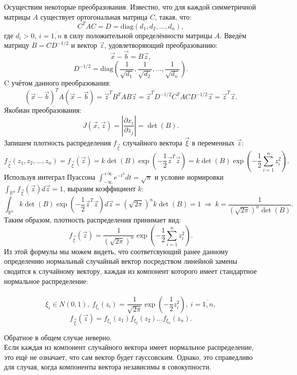 Осуществим некоторые преобразования. Известно, что для каждой симметричной матрицы $A$
существует ортогональная матрица $C$, такая, что: $$ C^T A C = D = \mathrm{diag}(d_1, d_2, \dots, d_n) ,$$
где $d_i > 0 ,~ i = \overline{1, n}$ в силу положительной определённости матрицы $A$. 
Введём матрицу \break $B = C D^{-1/2}$ и вектор $\vec{z}$,
удовлетворяющий преобразованию: $$\vec{x} - \vec{b} = B \vec{z} ,$$
$$ D^{-1/2} = \mathrm{diag}(\frac{1}{\sqrt{d_1}}, \frac{1}{\sqrt{d_2}}, \dots, \frac{1}{\sqrt{d_n}}) .$$
C учётом данного преобразования:
$$ (\vec{x} - \vec{b})^T A (\vec{x} - \vec{b}) =  \vec{z}^T B^T A B \vec{z} = 
\vec{z}^T D^{-1/2} C^T A C D^{-1/2} \vec{z} = \vec{z}^T \vec{z}.$$
Якобиан преобразования:
$$J(\vec{x}, \vec{z}) = \left\lvert \frac{\partial{x_i}}{\partial{z_j}} \right\rvert = \det(B).$$
Запишем плотность распределения $f_{\vec{\xi}}$ случайного вектора $\vec{\xi}$ в переменных $\vec{z}$:
$$ f_{\vec{\xi}}(z_1, z_2, \dots, z_n) = f_{\vec{\xi}}(\vec{z}) =
k \det(B) \exp(-\frac{1}{2} \vec{z}^T \vec{z}) = k \det(B) \exp(-\frac{1}{2} \sum_{i = 1}^{n} z_i^2) .$$
Используя интеграл Пуассона $\displaystyle\int_{-\infty}^{+\infty} e^{-t^2} dt = \sqrt{\pi}$ и условие нормировки
$\displaystyle\int_{\mathbb{R}^n} f_{\vec{\xi}}(\vec{z}) d\vec{z} = 1$, выразим коэффициент $k$:
$$ \int_{\mathbb{R}^n} k \det(B) \exp(-\frac{1}{2} \vec{z}^T \vec{z}) d\vec{z} = 
(\sqrt{2\pi})^n k \det(B) = 1 ~ \Rightarrow ~ k = \frac{1}{(\sqrt{2\pi})^n \det(B)} .$$
Таким образом, плотность распределения принимает вид:
$$ f_{\vec{\xi}}(\vec{z}) = \frac{1}{(\sqrt{2\pi})^n} \exp(-\frac{1}{2} \sum_{i = 1}^{n} z_i^2) .$$
Из этой формулы мы можем видеть, что соответсвующий ранее данному определению нормальный случайный вектор
посредством линейной замены сводится к случайному вектору,
каждая из компонент которого имеет стандартное нормальное распределение: \\\\
$$\xi_i \in N(0, 1) ,~ f_{\xi_i}(z_i) = \frac{1}{\sqrt{2\pi}} \exp(-\frac{1}{2} z_i^2) ,~ i = \overline{1, n} ,$$
$$ f_{\vec{\xi}}(\vec{z}) = f_{\xi_1}(z_1) f_{\xi_2}(z_2) \dots f_{\xi_n}(z_n) .$$ 

\begin{remark} Обратное в общем случае неверно. \\
Если каждая из компонент случайного вектора имеет нормальное распределение, это ещё не означает,
что сам вектор будет гауссовским. Однако, это справедливо для случая,
когда компоненты вектора независимы в совокупности. \\\\
\end{remark}


